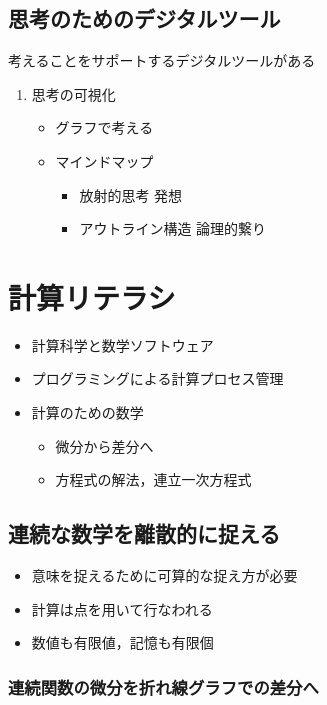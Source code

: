 \documentclass[dvipdfmx,11pat]{jarticle}
\begin{document}
\subsection{思考のためのデジタルツール}
\label{sec:orgcfbb24c}
考えることをサポートするデジタルツールがある
\begin{enumerate}
\item 思考の可視化
\label{sec:orgc8133fa}
\begin{itemize}
\item グラフで考える

\item マインドマップ
\begin{itemize}
\item 放射的思考 発想
\item アウトライン構造 論理的繋り
\end{itemize}
\end{itemize}
\end{enumerate}
\section{計算リテラシ}
\label{sec:org20be9bc}
\begin{itemize}
\item 計算科学と数学ソフトウェア
\item プログラミングによる計算プロセス管理
\item 計算のための数学
\begin{itemize}
\item 微分から差分へ
\item 方程式の解法，連立一次方程式
\end{itemize}
\end{itemize}
\subsection{連続な数学を離散的に捉える}
\label{sec:org69d922f}
\begin{itemize}
\item 意味を捉えるために可算的な捉え方が必要
\item 計算は点を用いて行なわれる
\item 数値も有限値，記憶も有限個
\end{itemize}
\subsubsection{連続関数の微分を折れ線グラフでの差分へ}
\label{sec:org565145a}
\end{document}
